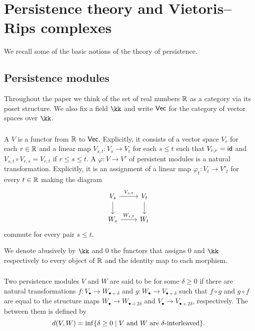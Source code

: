 
\section{Persistence theory and Vietoris--Rips complexes}

We recall some of the basic notions of the theory of persistence.

\subsection{Persistence modules}

Throughout the paper we think of the set of real numbers $\R$ as a category via its poset structure.
We also fix a field $\kk$ and write $\Vec$ for the category of vector spaces over $\kk$.

\subsubsection{} A  $V$ is a functor from $\R$ to $\Vec$.
Explicitly, it consists of a vector space $V_r$ for each $r \in \R$ and a linear map $V_{s,t} \colon V_s \to V_t$ for each $s \leq t$ such that $V_{r,r} = \id$ and
$V_{s,t} \circ V_{r,s} = V_{r,t}$ if $r \leq s \leq t$.
A  $\varphi \colon V \to V'$ of persistent modules is a natural transformation.
Explicitly, it is an assignment of a linear map $\varphi_t \colon V_t \to V'_t$ for every $t \in \R$ making the diagram
\begin{equation*}
	\begin{tikzcd}
		V_{s} \arrow[r, "V_{s,t}"] \arrow[d] & V_{t} \arrow[d] \\
		W_{s} \arrow[r, "W_{s,t}"] & W_{t}
	\end{tikzcd}
\end{equation*}
commute for every pair $s \leq t$.

We denote abusively by $\kk$ and $0$ the functors that assigns $0$ and $\kk$ respectively to every object of $\R$ and the identity map to each morphism.


\subsubsection{} Two persistence modules $V$ and $W$ are said to be  for some $\delta \geq 0$ if there are natural transformations $f \colon V_{\bullet} \to W_{\bullet + \delta}$ and $g \colon W_{\bullet} \to V_{\bullet + \delta}$ such that $f \circ g$ and $g \circ f$ are equal to the structure maps $W_{\bullet} \to W_{\bullet + 2\delta}$ and $V_{\bullet} \to V_{\bullet + 2\delta}$, respectively.
The  between them is defined by
\[
d(V, W) = \inf\set{\delta \geq 0 \mid V \text{ and } W \text{ are } \delta\text{-interleaved}}.
\]

